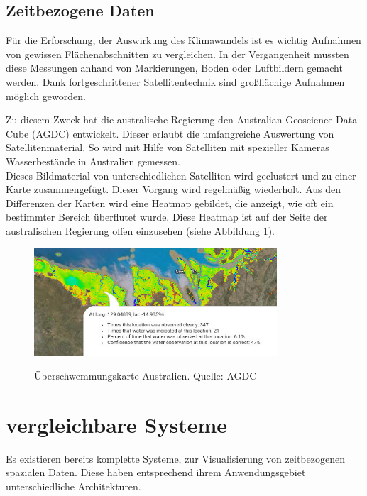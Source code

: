 \documentclass[10pt,conference,compsocconf]{IEEEtran}
\begin{document}
\subsection{Zeitbezogene Daten}
\label{sub:zeitbezogene_daten}
Für die Erforschung, der Auswirkung des Klimawandels ist es wichtig Aufnahmen von gewissen Flächenabschnitten zu vergleichen. In der Vergangenheit mussten diese Messungen anhand von Markierungen, Boden oder Luftbildern gemacht werden. Dank fortgeschrittener Satellitentechnik sind großflächige Aufnahmen möglich geworden.\par

Zu diesem Zweck hat die australische Regierung den Australian Geoscience Data Cube (AGDC) entwickelt. Dieser erlaubt die umfangreiche Auswertung von Satellitenmaterial. So wird mit Hilfe von Satelliten mit spezieller Kameras Wasserbestände in Australien gemessen.\\
Dieses Bildmaterial von unterschiedlichen Satelliten wird geclustert und zu einer Karte zusammengefügt. Dieser Vorgang wird regelmäßig wiederholt. Aus den Differenzen der Karten wird eine Heatmap gebildet, die anzeigt, wie oft ein bestimmter Bereich überflutet wurde. Diese Heatmap ist auf der Seite der australischen Regierung offen einzusehen (siehe Abbildung \ref{img:agcd_flood}).

\begin{figure}[H]
  \centering
  	\includegraphics[height=114pt]{img/agcd_flood}\\
  \caption[]{Überschwemmungskarte Australien. Quelle: AGDC\footnotemark}
  \label{img:agcd_flood}
\end{figure}


\section{vergleichbare Systeme}
Es existieren bereits komplette Systeme, zur Visualisierung von zeitbezogenen spazialen Daten. Diese haben entsprechend ihrem Anwendungsgebiet unterschiedliche Architekturen.
\end{document}
